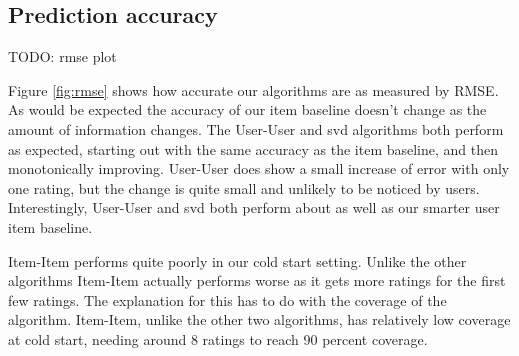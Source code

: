 \documentclass[letterpaper]{sig-alternate}
\begin{document}
\subsection{Prediction accuracy}

TODO: rmse plot

  Figure \ref{fig:rmse} shows how accurate our algorithms are as measured by RMSE.
  As would be expected the accuracy of our item baseline doesn't change as the amount of information changes.
  The User-User and svd algorithms both perform as expected, starting out with the same accuracy as the item baseline, and then monotonically improving.
  User-User does show a small increase of error with only one rating, but the change is quite small and unlikely to be noticed by users.
  Interestingly, User-User and svd both perform about as well as our smarter user item baseline. %

  Item-Item performs quite poorly in our cold start setting.
  Unlike the other algorithms Item-Item actually performs worse as it gets more ratings for the first few ratings.
  The explanation for this has to do with the coverage of the algorithm.
  Item-Item, unlike the other two algorithms, has relatively low coverage at cold start, needing around 8 ratings to reach 90 percent coverage. %
  

\end{document}
